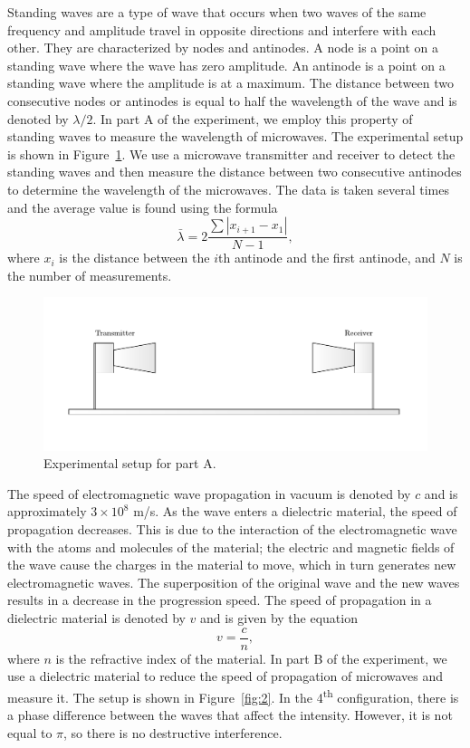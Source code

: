 \documentclass[10pt]{article}
\begin{document}
Standing waves are a type of wave that occurs when two waves of the same frequency and amplitude travel in opposite directions and interfere with each other. They are characterized by nodes and antinodes. A node is a point on a standing wave where the wave has zero amplitude. An antinode is a point on a standing wave where the amplitude is at a maximum. The distance between two consecutive nodes or antinodes is equal to half the wavelength of the wave and is denoted by $\lambda/2$. In part A of the experiment, we employ this property of standing waves to measure the wavelength of microwaves. The experimental setup is shown in Figure~\ref{fig:1}. We use a microwave transmitter and receiver to detect the standing waves and then measure the distance between two consecutive antinodes to determine the wavelength of the microwaves. The data is taken several times and the average value is found using the formula
\begin{equation}\label{eq:average-wavelength}
  \bar{\lambda} = 2 \frac{\sum\left|x_{i+1}-x_1\right|}{N-1},
\end{equation}
where $x_i$ is the distance between the $i$th antinode and the first antinode, and $N$ is the number of measurements.

\begin{figure}[ht]
  \centering
  \includegraphics[scale=0.4]{figures/f1.pdf}
  \caption{Experimental setup for part A.}
  \label{fig:1}
\end{figure}

The speed of electromagnetic wave propagation in vacuum is denoted by $c$ and is approximately $3 \times 10^8$ m/s. As the wave enters a dielectric material, the speed of propagation decreases. This is due to the interaction of the electromagnetic wave with the atoms and molecules of the material; the electric and magnetic fields of the wave cause the charges in the material to move, which in turn generates new electromagnetic waves. The superposition of the original wave and the new waves results in a decrease in the progression speed. The speed of propagation in a dielectric material is denoted by $v$ and is given by the equation
\begin{equation}
  v = \frac{c}{n},
\end{equation}
where $n$ is the refractive index of the material. In part B of the experiment, we use a dielectric material to reduce the speed of propagation of microwaves and measure it. The setup is shown in Figure~\ref{fig:2}. In the 4\textsuperscript{th} configuration, there is a phase difference between the waves that affect the intensity. However, it is not equal to $\pi$, so there is no destructive interference. 
\end{document}
